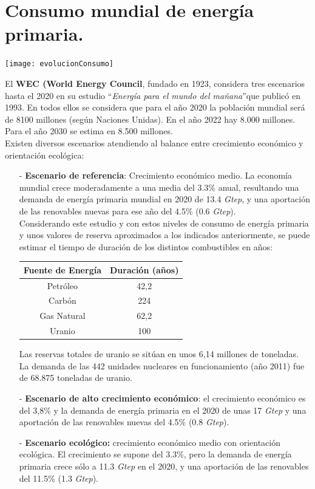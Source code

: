 \section{Consumo mundial de energía primaria.}
	\texttt{[image: evolucionConsumo]}
	
	El \textbf{WEC (World Energy Council}, fundado en 1923, considera tres
	escenarios hasta el 2020 en su estudio \textquotedblleft \textit{Energía para el mundo del mañana}\textquotedblright que publicó en 1993.
	En todos ellos se considera que para el año 2020 la población mundial será de 8100 millones
	(según Naciones Unidas). En el año 2022 hay 8.000 millones. Para el año 2030 se estima en 8.500
	millones.\\
	\indent Existen diversos escenarios atendiendo al balance entre crecimiento económico y orientación ecológica:
	\begin{itemize}
		\item[-] \textbf{Escenario de referencia}: 
			Crecimiento económico medio. La economía mundial crece
			moderadamente a una media del 3.3\% anual, resultando una demanda de energía primaria
			mundial en 2020 de 13.4 \textit{Gtep}, y una aportación de las renovables nuevas para ese año del 4.5\% (0.6 \textit{Gtep}).\\
			Considerando este estudio y con estos niveles de consumo de energía primaria y unos valores
			de reserva aproximados a los indicados anteriormente, se puede estimar el tiempo de duración de los
			distintos combustibles en años: 
			
			\begin{table}[H]
				\renewcommand{\arraystretch}{1.2}
				\centering
				\begin{tabular}{cc}
					\hline
					\textbf{Fuente de Energía} & \textbf{Duración (años)} \\
					\hline
					Petróleo & 42,2 \\
					Carbón & 224 \\
					Gas Natural & 62,2 \\
					Uranio & 100 \\
					\hline
				\end{tabular}
			\end{table}
			
			Las reservas totales de uranio se sitúan en unos 6,14 millones de toneladas. La demanda de las 442 unidades
			nucleares en funcionamiento (año 2011) fue de 68.875 toneladas de uranio.
			
		\item[-] \textbf{Escenario de alto crecimiento económico}: 
			el crecimiento económico es del 3,8\% y la demanda de energía primaria en el 2020 de unas 17 \textit{Gtep} y una aportación de las renovables nuevas del 4.5\% (0.8 \textit{Gtep}).
			
		\item[-] \textbf{Escenario ecológico:} 
			crecimiento económico medio con orientación ecológica. El crecimiento se supone del 3.3\%, pero la demanda de energía primaria crece sólo a 11.3 \textit{Gtep} en el 2020, y una aportación de las renovables del 11.5\% (1.3 \textit{Gtep}).
	\end{itemize}

